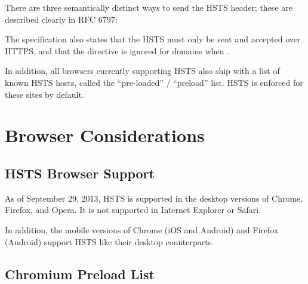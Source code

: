 \documentclass{acm_proc_article-sp}
\begin{document}
{There are three semantically distinct ways to send the HSTS header; these are described clearly in RFC 6797\cite{rfc}:

{}
{}
{}

The specification also states that the HSTS must only be sent and accepted over HTTPS, and that the {\iSD} directive is ignored for domains when .

In addition, all browsers currently supporting HSTS also ship with a list of known HSTS hosts, called the ``pre-loaded'' / ``preload'' list. HSTS is enforced for these sites by default.

\section{Browser Considerations}
\firstsubsectionskip
\subsection{HSTS Browser Support}

As of September 29, 2013, HSTS is supported in the desktop versions of Chrome, Firefox, and Opera. It is not supported in Internet Explorer or Safari.\cite{support}

In addition, the mobile versions of Chrome (iOS and Android) and Firefox (Android) support HSTS like their desktop counterparts\cite{mdn}.

\subsection{Chromium Preload List}

}
\end{document}
